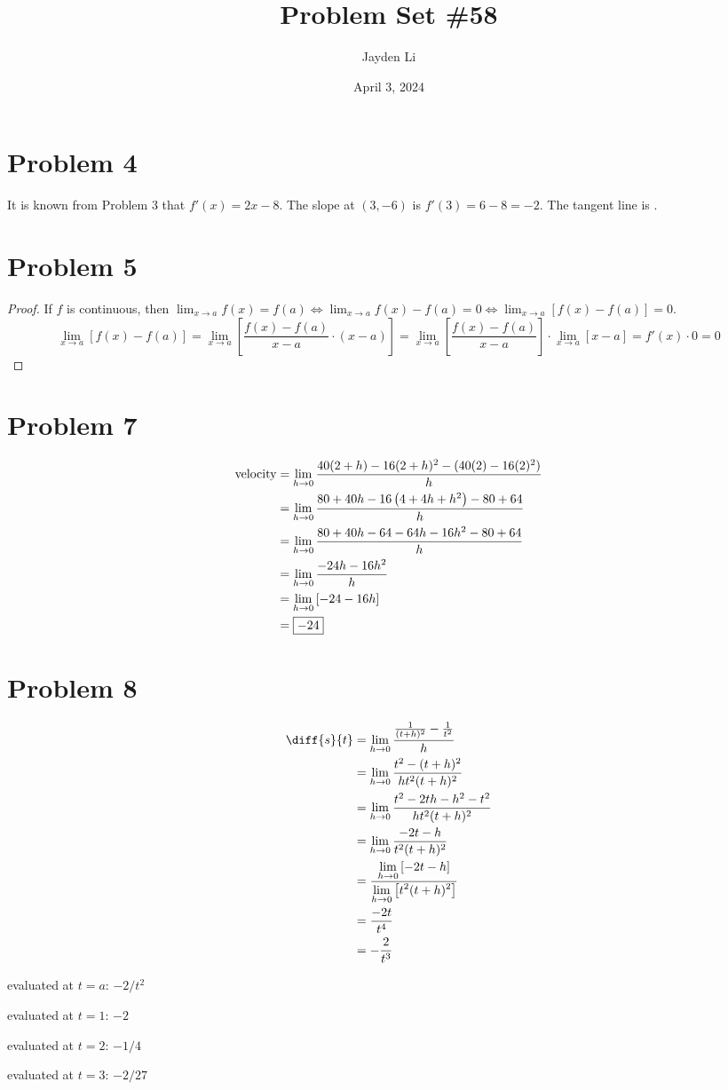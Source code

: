 \documentclass{article}
\title{Problem Set \#58}
\author{Jayden Li}
\date{April 3, 2024}
\newcommand*{\paren}[1]{\ensuremath\left(#1\right)}
\newcommand*{\problem}[1]{\section*{Problem #1}}
\newcommand*{\limit}[2][x]{\ensuremath{\displaystyle\lim_{#1\to#2}}}
\newcommand*{\Limit}[3][x]{\ensuremath{\displaystyle\lim_{#1\to#2}\left[#3\right]}}
\begin{document}
\fontsize{12pt}{12pt}\selectfont
\setlength{\abovedisplayskip}{0pt}
\maketitle

\problem{4}
It is known from Problem 3 that $f'(x)=2x-8$. The slope at $(3,-6)$ is $f'(3)=6-8=-2$. The tangent line is .

\problem{5}
\begin{proof}
	If $f$ is continuous, then $\limit{a}f(x)=f(a)\iff\limit{a}f(x)-f(a)=0\iff\Limit{a}{f(x)-f(a)}=0$.
	\begin{equation*}
		\Limit{a}{f(x)-f(a)}=\Limit{a}{\frac{f(x)-f(a)}{x-a}\cdot(x-a)}=\Limit{a}{\frac{f(x)-f(a)}{x-a}}\cdot\Limit{a}{x-a}=f'(x)\cdot0=0
	\end{equation*}
\end{proof}

\problem{7}
\begin{align*}
	\text{velocity}&=\limit[h]{0}\frac{40(2+h)-16(2+h)^2-(40(2)-16(2)^2)}{h} \\
	&=\limit[h]{0}\frac{80+40h-16\paren{4+4h+h^2}-80+64}{h} \\
	&=\limit[h]{0}\frac{80+40h-64-64h-16h^2-80+64}{h} \\
	&=\limit[h]{0}\frac{-24h-16h^2}{h} \\
	&=\Limit[h]{0}{-24-16h} \\
	&=\boxed{-24} \\
\end{align*}

\problem{8}
\begin{align*}
	\diff{s}{t}&=\limit[h]{0}\frac{\frac{1}{(t+h)^2}-\frac{1}{t^2}}{h} \\
	&=\limit[h]{0}\frac{t^2-(t+h)^2}{ht^2(t+h)^2} \\
	&=\limit[h]{0}\frac{t^2-2th-h^2-t^2}{ht^2(t+h)^2} \\
	&=\limit[h]{0}\frac{-2t-h}{t^2(t+h)^2} \\
	&=\frac{\Limit[h]{0}{-2t-h}}{\Limit[h]{0}{t^2(t+h)^2}} \\
	&=\frac{-2t}{t^4} \\
	&=-\frac{2}{t^3}
\end{align*}

\begin{center}
	evaluated at $t=a$: $-2/t^2$

	evaluated at $t=1$: $-2$

	evaluated at $t=2$: $-1/4$

	evaluated at $t=3$: $-2/27$
\end{center}
\end{document}
